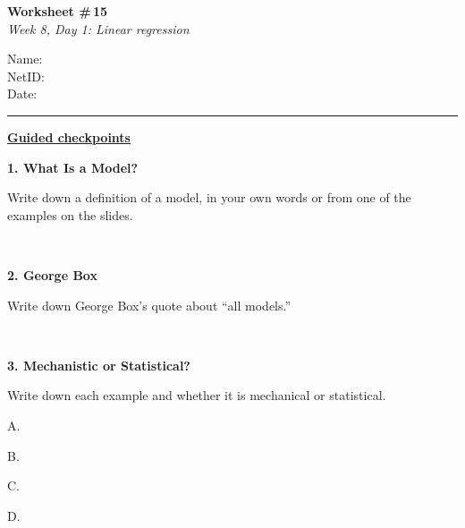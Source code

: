 \documentclass[11pt]{article}
\newcommand{\blankspace}[1]{%
  \vspace{0.3em}
  \begin{minipage}[t][#1][t]{\linewidth}
  \end{minipage}
  \vspace{0.3em}
}
\newcommand{\guidedopen}[4]{%
  \noindent\textbf{#1}\\[0.18em]
  \noindent
  \begin{minipage}[t]{0.485\textwidth}
    #2
    \blankspace{#3}
  \end{minipage}
  \hfill
  \begin{minipage}[t]{0.485\textwidth}
    \blankspace{#4}
  \end{minipage}
  \\[0.4em]
}
\begin{document}
\RaggedRight

\noindent
\begin{minipage}[t]{0.55\textwidth}
  \vspace{0pt}
  {\LARGE \textbf{Worksheet \#\,15}} \\[0.18em]
  {\large \textit{Week 8, Day 1: Linear regression}}
\end{minipage}
\hfill
\begin{minipage}[t]{0.40\textwidth}
  \vspace{0pt}
  \small
  Name: \underline{\hspace{4.5cm}} \\[0.35em]
  NetID: \underline{\hspace{4.3cm}} \\[0.35em]
  Date: \underline{\hspace{4.4cm}} \\
\end{minipage}

\vspace{0.6em}
\noindent\rule{\linewidth}{0.6pt}
\vspace{0.1em}

\noindent\underline{\textbf{Guided checkpoints}}\\[0.2em]
\vspace{0.8em}

\guidedopen{1. What Is a Model?}{
Write down a definition of a model, in your own words or from one of the examples on the slides.
}{1.2cm}{2.2cm}

\vfill

\guidedopen{2. George Box}{
Write down George Box's quote about ``all models.''
}{0.8cm}{1.4cm}

\vfill

\guidedopen{3. Mechanistic or Statistical?}{
Write down each example and whether it is mechanical or statistical.

\vspace{0.5em}
A.
\vspace{0.65cm}

B.
\vspace{0.65cm}

C.
\vspace{0.65cm}

D.
}{0.65cm}{5.4cm}
\end{document}

